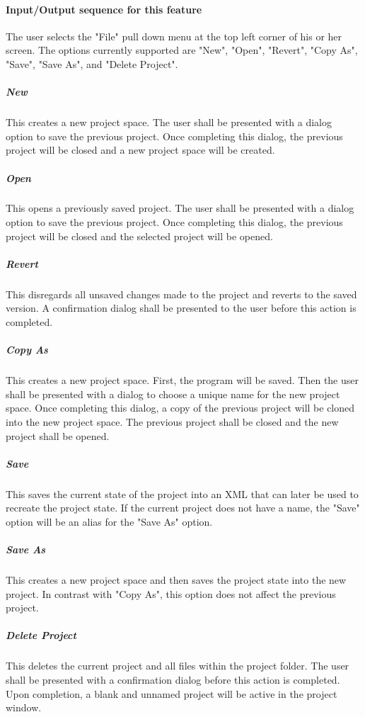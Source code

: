 \documentclass[twoside,letterpaper]{article}
\begin{document}
\paragraph[Input/Output sequence for this feature]{\rmfamily\bfseries\color{black}
Input/Output sequence for this feature}
{\color{black}
The user selects the "File" pull down menu at the top left corner of his or her screen. The options currently supported are "New", "Open", "Revert", "Copy As", "Save", "Save As", and "Delete Project". }

\subparagraph{New}
{\color{black}
This creates a new project space. The user shall be presented with a dialog option to save the previous project. Once completing this dialog, the previous project will be closed and a new project space will be created. }

\subparagraph{Open}
{\color{black}
This opens a previously saved project. The user shall be presented with a dialog option to save the previous project. Once completing this dialog, the previous project will be closed and the selected project will be opened.}

\subparagraph{Revert}
{\color{black}
This disregards all unsaved changes made to the project and reverts to the saved version. A confirmation dialog shall be presented to the user before this action is completed.}

\subparagraph{Copy As}
{\color{black}
This creates a new project space. First, the program will be saved. Then the user shall be presented with a dialog to choose a unique name for the new project space. Once completing this dialog, a copy of the previous project will be cloned into the new project space. The previous project shall be closed and the new project shall be opened.}

\subparagraph{Save}
{\color{black}
This saves the current state of the project into an XML that can later be used to recreate the project state. If the current project does not have a name, the "Save" option will be an alias for the "Save As" option.}

\subparagraph{Save As}
{\color{black}
This creates a new project space and then saves the project state into the new project. In contrast with "Copy As", this option does not affect the previous project. }

\subparagraph{Delete Project}
{\color{black}
This deletes the current project and all files within the project folder. The user shall be presented with a confirmation dialog before this action is completed. Upon completion, a blank and unnamed project will be active in the project window. }
\end{document}
